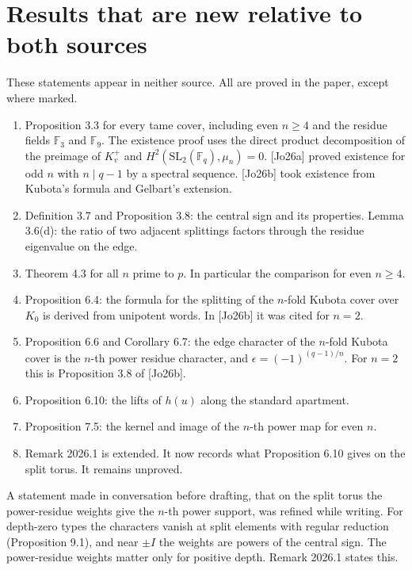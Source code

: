 \documentclass[12pt,letterpaper]{article}
\begin{document}
\section{Results that are new relative to both sources}
These statements appear in neither source. All are proved in the paper, except where marked.
\begin{enumerate}[leftmargin=2em]
\item Proposition 3.3 for every tame cover, including even $n\ge4$ and the residue fields $\mathbb F_3$ and $\mathbb F_9$. The existence proof uses the direct product decomposition of the preimage of $K_v^+$ and $H^2(\mathrm{SL}_2(\mathbb F_q),\mu_n)=0$. [Jo26a] proved existence for odd $n$ with $n\mid q-1$ by a spectral sequence. [Jo26b] took existence from Kubota's formula and Gelbart's extension.
\item Definition 3.7 and Proposition 3.8: the central sign and its properties. Lemma 3.6(d): the ratio of two adjacent splittings factors through the residue eigenvalue on the edge.
\item Theorem 4.3 for all $n$ prime to $p$. In particular the comparison for even $n\ge4$.
\item Proposition 6.4: the formula for the splitting of the $n$-fold Kubota cover over $K_0$ is derived from unipotent words. In [Jo26b] it was cited for $n=2$.
\item Proposition 6.6 and Corollary 6.7: the edge character of the $n$-fold Kubota cover is the $n$-th power residue character, and $\epsilon=(-1)^{(q-1)/n}$. For $n=2$ this is Proposition 3.8 of [Jo26b].
\item Proposition 6.10: the lifts of $h(u)$ along the standard apartment.
\item Proposition 7.5: the kernel and image of the $n$-th power map for even $n$.
\item Remark 2026.1 is extended. It now records what Proposition 6.10 gives on the split torus. It remains unproved.
\end{enumerate}
A statement made in conversation before drafting, that on the split torus the power-residue weights give the $n$-th power support, was refined while writing. For depth-zero types the characters vanish at split elements with regular reduction (Proposition 9.1), and near $\pm I$ the weights are powers of the central sign. The power-residue weights matter only for positive depth. Remark 2026.1 states this.
\end{document}
